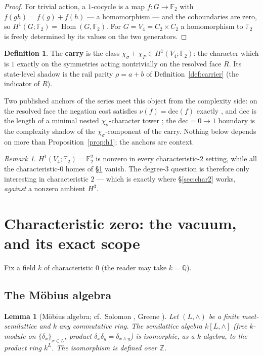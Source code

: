 \documentclass[11pt]{article}
\newtheorem{lemma}[theorem]{Lemma}
\theoremstyle{definition}
\newtheorem{definition}[theorem]{Definition}
\theoremstyle{remark}
\newtheorem{remark}[theorem]{Remark}
\newcommand{\F}{\mathbb{F}}
\newcommand{\Z}{\mathbb{Z}}
\newcommand{\Q}{\mathbb{Q}}
\newcommand{\Hom}{\operatorname{Hom}}
\begin{document}
\begin{proof}
For trivial action, a $1$-cocycle is a map $f:G\to\F_2$ with $f(gh)=f(g)+f(h)$ --- a homomorphism --- and the coboundaries are zero, so $H^1(G;\F_2)=\Hom(G,\F_2)$. For $G=V_4=C_2\times C_2$ a homomorphism to $\F_2$ is freely determined by its values on the two generators.
\end{proof}

\begin{definition}\label{def:carry}
The \textbf{carry} is the class $\chi_\sigma+\chi_P\in H^1(V_4;\F_2)$: the character which is $1$ exactly on the symmetries acting nontrivially on the resolved face $R$. Its state-level shadow is the rail parity $\rho=a+b$ of Definition~\ref{def:carrier} (the indicator of $R$).
\end{definition}

Two published anchors of the series meet this object from the complexity side: on the resolved face the negation cost satisfies $\nu(f)=\mathrm{dec}(f)$ exactly \cite{wcy2}, and $\mathrm{dec}$ is the length of a minimal nested $\chi_\sigma$-character tower \cite{cohom}; the $\mathrm{dec}=0\to1$ boundary is the complexity shadow of the $\chi_\sigma$-component of the carry. Nothing below depends on more than Proposition~\ref{prop:h1}; the anchors are context.

\begin{remark}
$H^1(V_4;\F_2)=\F_2^2$ is nonzero in every characteristic-$2$ setting, while all the characteristic-$0$ homes of \S\ref{sec:char0} vanish. The degree-$3$ question is therefore only interesting in characteristic $2$ --- which is exactly where \S\ref{sec:char2} works, \emph{against} a nonzero ambient $H^3$.
\end{remark}

\section{Characteristic zero: the vacuum, and its exact scope}\label{sec:char0}

Fix a field $k$ of characteristic $0$ (the reader may take $k=\Q$).

\subsection{The M\"obius algebra}

\begin{lemma}[M\"obius algebra; cf.\ Solomon \cite{solomon}, Greene \cite{greene}]\label{lem:mobius}
Let $(L,\wedge)$ be a finite meet-semilattice and $k$ any commutative ring. The semilattice algebra $k[L,\wedge]$ (free $k$-module on $\{\delta_x\}_{x\in L}$, product $\delta_x\delta_y=\delta_{x\wedge y}$) is isomorphic, as a $k$-algebra, to the product ring $k^L$. The isomorphism is defined over $\Z$.
\end{lemma}
\end{document}
